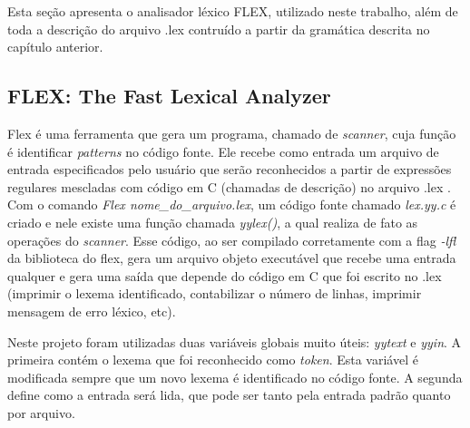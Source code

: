 \documentclass[12pt]{article}
\begin{document}
\indent Esta seção apresenta o analisador léxico FLEX, utilizado neste trabalho, além de toda a descrição do arquivo .lex contruído a partir da gramática descrita no capítulo anterior.

\subsection{FLEX: The Fast Lexical Analyzer}

\indent Flex é uma ferramenta que gera um programa, chamado de \textit{scanner}, cuja função é identificar \textit{patterns} no código fonte. Ele recebe como entrada um arquivo de entrada especificados pelo usuário que serão reconhecidos a partir de expressões regulares mescladas com código em C (chamadas de descrição) no arquivo .lex \cite{flex}. Com o comando \textit{Flex nome\_do\_arquivo.lex}, um código fonte chamado \textit{lex.yy.c} é criado e nele existe uma função chamada \textit{yylex()}, a qual realiza de fato as operações do \textit{scanner}. Esse código, ao ser compilado corretamente com a flag \textit{-lfl} da biblioteca do flex, gera um arquivo objeto executável que recebe uma entrada qualquer e gera uma saída que depende do código em C que foi escrito no .lex (imprimir o lexema identificado, contabilizar o número de linhas, imprimir mensagem de erro léxico, etc).

\indent Neste projeto foram utilizadas duas variáveis globais muito úteis: \textit{yytext} e \textit{yyin}. A primeira contém o lexema que foi reconhecido como \textit{token}. Esta variável é modificada sempre que um novo lexema é identificado no código fonte. A segunda define como a entrada será lida, que pode ser tanto pela entrada padrão quanto por arquivo.
\end{document}
